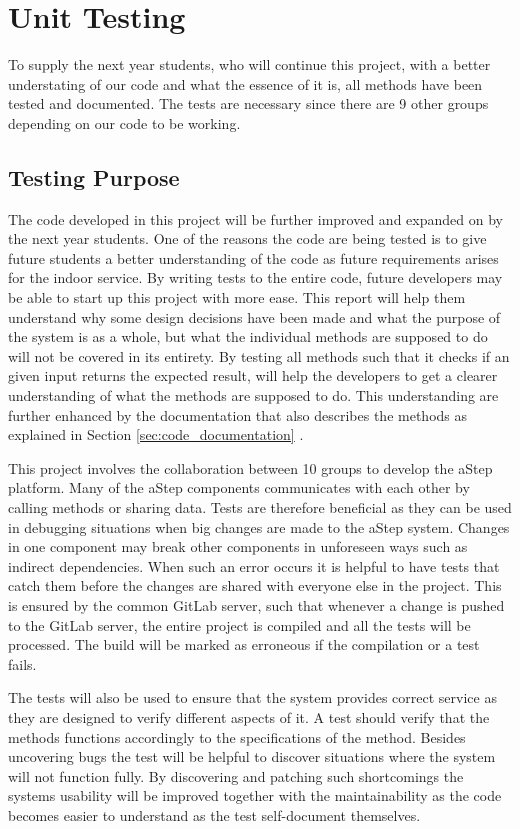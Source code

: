 \section{Unit Testing}\label{sec:unit_test}
To supply the next year students, who will continue this project, with a better understating of our code and what the essence of it is, all methods have been tested and documented. 
The tests are necessary since there are 9 other groups depending on our code to be working.

\subsection{Testing Purpose}
The code developed in this project will be further improved and expanded on by the next year students. One of the reasons the code are being tested is to give future students a better understanding of the code as future requirements arises for the indoor service. 
By writing tests to the entire code, future developers may be able to start up this project with more ease. 
This report will help them understand why some design decisions have been made and what the purpose of the system is as a whole, but what the individual methods are supposed to do will not be covered in its entirety. 
By testing all methods such that it checks if an given input returns the expected result, will help the developers to get a clearer understanding of what the methods are supposed to do. 
This understanding are further enhanced by the documentation that also describes the methods as explained in Section \ref{sec:code_documentation} . 

This project involves the collaboration between 10 groups to develop the aStep platform. 
Many of the aStep components communicates with each other by calling methods or sharing data.
Tests are therefore beneficial as they can be used in debugging situations when big changes are made to the aStep system. 
Changes in one component may break other components in unforeseen ways such as indirect dependencies.
When such an error occurs it is helpful to have tests that catch them before the changes are shared with everyone else in the project. This is ensured by the common GitLab server, such that whenever a change is pushed to the GitLab server, the entire project is compiled and all the tests will be processed. The build will be marked as erroneous if the compilation or a test fails.

The tests will also be used to ensure that the system provides correct service as they are designed to verify different aspects of it.
A test should verify that the methods functions accordingly to the specifications of the method.
Besides uncovering bugs the test will be helpful to discover situations where the system will not function fully.
By discovering and patching such shortcomings the systems usability will be improved together with the maintainability as the code becomes easier to understand as the test self-document themselves. 

